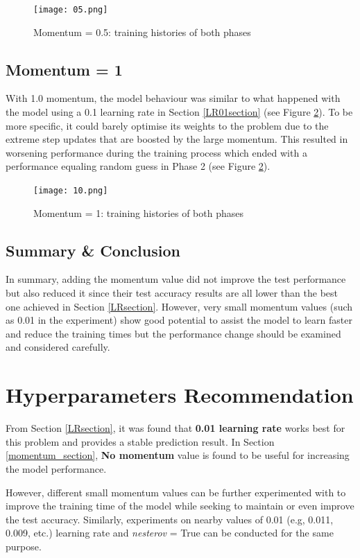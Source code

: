 \documentclass[]{article}
\begin{document}
\begin{figure}[H]
  \texttt{[image: 05.png]}
  \centering
  \caption{Momentum = 0.5: training histories of both phases}
  \label{M_05}
\end{figure}

\subsection{Momentum = 1}

With 1.0 momentum, the model behaviour was similar to what happened with the model using a 0.1 learning rate in Section \ref{LR01section} (see Figure \ref{M_10}). To be more specific, it could barely optimise its weights to the problem due to the extreme step updates that are boosted by the large momentum. This resulted in worsening performance during the training process which ended with a performance equaling random guess in Phase 2 (see Figure \ref{M_10}).


\begin{figure}[H]
  \texttt{[image: 10.png]}
  \centering
  \caption{Momentum = 1: training histories of both phases}
  \label{M_10}
\end{figure}

\subsection{Summary \& Conclusion}

In summary, adding the momentum value did not improve the test performance but also reduced it since their test accuracy results are all lower than the best one achieved in Section \ref{LRsection}. However, very small momentum values (such as 0.01 in the experiment) show good potential to assist the model to learn faster and reduce the training times but the performance change should be examined and considered carefully.

\section{Hyperparameters Recommendation}

From Section \ref{LRsection}, it was found that \textbf{0.01 learning rate} works best for this problem and provides a stable prediction result. In Section \ref{momentum_section}, \textbf{No momentum} value is found to be useful for increasing the model performance. 

However, different small momentum values can be further experimented with to improve the training time of the model while seeking to maintain or even improve the test accuracy. Similarly, experiments on nearby values of 0.01 (e.g, 0.011, 0.009, etc.) learning rate and \textit{nesterov} = True can be conducted for the same purpose. 
\end{document}
